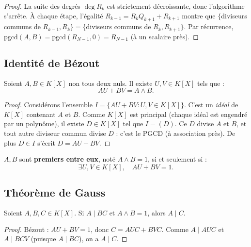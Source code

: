 \begin{proof}
La suite des degrés $\deg R_k$ est strictement décroissante, donc l'algorithme s'arrête. À chaque étape, l'égalité $R_{k-1} = R_k Q_{k+1} + R_{k+1}$ montre que $\{$diviseurs communs de $R_{k-1}, R_k\} = \{$diviseurs communs de $R_k, R_{k+1}\}$. Par récurrence, $\mathrm{pgcd}(A, B) = \mathrm{pgcd}(R_{N-1}, 0) = R_{N-1}$ (à un scalaire près).
\end{proof}

\subsection{Identité de Bézout}

\begin{theoreme}
Soient $A, B \in K[X]$ non tous deux nuls. Il existe $U, V \in K[X]$ tels que :
\[ A U + B V = A \wedge B. \]
\end{theoreme}

\begin{proof}
Considérons l'ensemble $I = \{ A U + B V : U, V \in K[X]\}$. C'est un \emph{idéal} de $K[X]$ contenant $A$ et $B$. Comme $K[X]$ est principal (chaque idéal est engendré par un polynôme), il existe $D \in K[X]$ tel que $I = (D)$. Ce $D$ divise $A$ et $B$, et tout autre diviseur commun divise $D$ : c'est le PGCD (à association près). De plus $D \in I$ s'écrit $D = A U + B V$.
\end{proof}

\begin{corollaire}
$A, B$ sont \textbf{premiers entre eux}, noté $A \wedge B = 1$, si et seulement si :
\[ \exists U, V \in K[X],\quad A U + B V = 1. \]
\end{corollaire}

\subsection{Théorème de Gauss}

\begin{theoreme}[Gauss]
Soient $A, B, C \in K[X]$. Si $A \mid B C$ et $A \wedge B = 1$, alors $A \mid C$.
\end{theoreme}

\begin{proof}
Bézout : $A U + B V = 1$, donc $C = A U C + B V C$. Comme $A \mid A U C$ et $A \mid B C V$ (puisque $A \mid B C$), on a $A \mid C$.
\end{proof}

